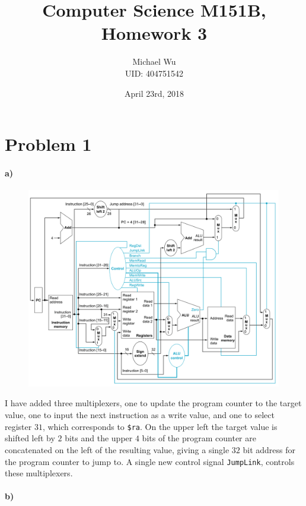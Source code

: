 \documentclass[12pt]{article}
\begin{document}
\title{Computer Science M151B, Homework 3}
\date{April 23rd, 2018}
\author{Michael Wu\\UID: 404751542}
\maketitle

\section*{Problem 1}

\paragraph{a)}

\begin{figure}[ht]
    \begin{center}
        \includegraphics[width=4.4in]{problem1a.png}
    \end{center}
\end{figure}

I have added three multiplexers, one to update the program counter to the target value, one to input the next instruction as a write
value, and one to select register \(31\), which corresponds to \texttt{\$ra}. On the upper left the target value is shifted left by \(2\)
bits and the upper \(4\) bits of the program counter are concatenated on the left of the resulting value, giving a single \(32\) bit address
for the program counter to jump to. A single new control signal \texttt{JumpLink}, controls these multiplexers.

\paragraph{b)}
\end{document}
